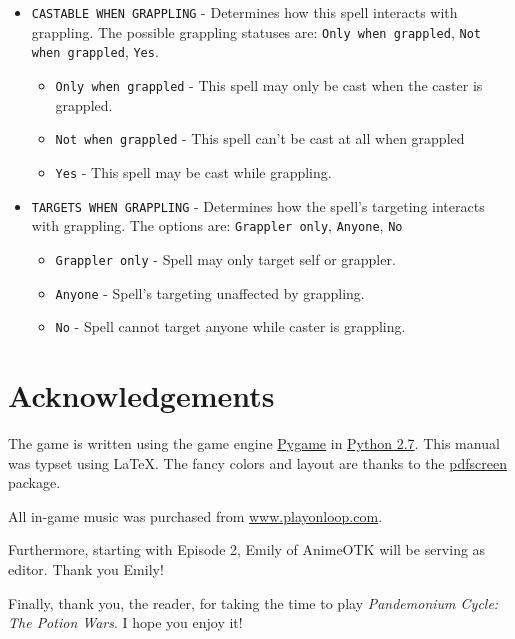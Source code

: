 \documentclass{report}
\begin{document}
\begin{itemize}
    \item \verb|CASTABLE WHEN GRAPPLING| - Determines how this spell interacts with
    grappling. The possible grappling statuses are: \verb|Only when grappled|, 
    \verb|Not when grappled|, \verb|Yes|. 
        \begin{itemize}
            \item \verb|Only when grappled| - This spell may only be cast when
            the caster is grappled.
            \item \verb|Not when grappled| - This spell can't be cast at all
            when grappled
            \item \verb|Yes| - This spell may be cast while grappling.
        \end{itemize}
    \item \verb|TARGETS WHEN GRAPPLING| - Determines how the spell's targeting
    interacts with grappling. The options are: \verb|Grappler only|, \verb|Anyone|,
    \verb|No|
    \begin{itemize}
        \item \verb|Grappler only| - Spell may only target self or grappler.
        \item \verb|Anyone| - Spell's targeting unaffected by grappling.
        \item \verb|No| - Spell cannot target anyone while caster is grappling.
    \end{itemize}
\end{itemize}

\chapter{Acknowledgements}

The game is written using the game engine \href{www.pygame.org}{Pygame} in \href{www.python.org}{Python 2.7}. This manual was typset using \LaTeX. The fancy colors and 
layout are thanks to the \href{texcatalogue.ctan.org/entries/pdfscreen.html}{pdfscreen} package.

All in-game music was purchased from \url{www.playonloop.com}.

Furthermore, starting with Episode 2, Emily of AnimeOTK will be serving as editor. Thank you Emily!

Finally, thank you, the reader, for taking the time to play \textit{Pandemonium Cycle: The Potion Wars}. I hope you enjoy it! 
\end{document}
